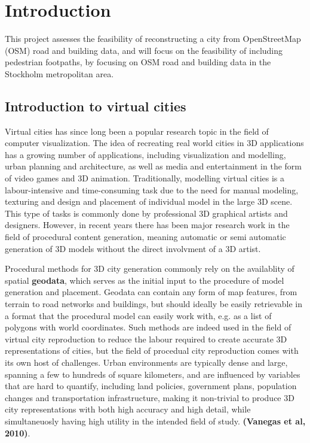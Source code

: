 \documentclass{kththesis}
\begin{document}
\chapter{Introduction}

This project assesses the feasibility of reconstructing a city from OpenStreetMap (OSM) road and building data, and will focus on the feasibility of including pedestrian footpaths, by focusing on OSM road and building data in the Stockholm metropolitan area.

\section{Introduction to virtual cities}

Virtual cities has since long been a popular research topic in the field of computer visualization.
The idea of recreating real world cities in 3D applications has a growing number of applications, including visualization and modelling, urban planning and architecture, as well as media and entertainment in the form of video games and 3D animation.
Traditionally, modelling virtual cities is a labour-intensive and time-consuming task due to the need for manual modeling, texturing and design and placement of individual model in the large 3D scene.
This type of tasks is commonly done by professional 3D graphical artists and designers.
However, in recent years there has been major research work in the field of procedural content generation, meaning automatic or semi automatic generation of 3D models without the direct involvment of a 3D artist.

Procedural methods for 3D city generation commonly rely on the availablity of spatial \textbf{geodata}, which serves as the initial input to the procedure of model generation and placement.
Geodata can contain any form of map features, from terrain to road networks and buildings, but should ideally be easily retrievable in a format that the procedural model can easily work with, e.g. as a list of polygons with world coordinates.
Such methods are indeed used in the field of virtual city reproduction to reduce the labour required to create accurate 3D representations of cities, but the field of procedual city reproduction comes with its own host of challenges.
Urban environments are typically dense and large, spanning a few to hundreds of square kilometers, and are influenced by variables that are hard to quantify, including land policies, government plans, population changes and transportation infrastructure, making it non-trivial to produce 3D city representations with both high accuracy and high detail, while simultaneuosly having high utility in the intended field of study.
\textbf{(Vanegas et al, 2010)}.
\end{document}

